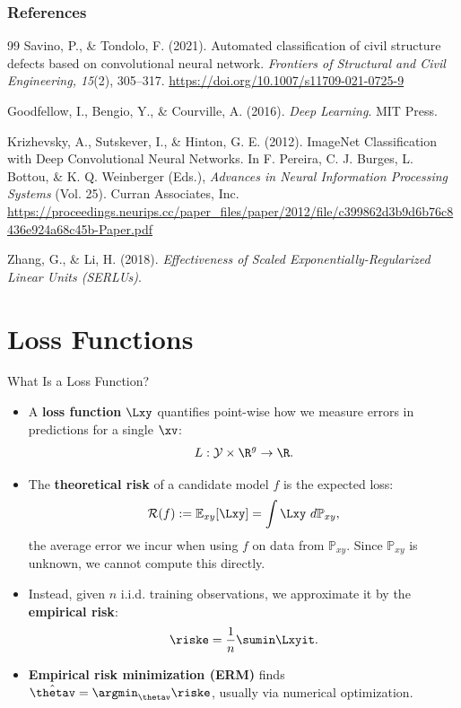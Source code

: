 \begin{vbframe}
\frametitle{References}
\footnotesize{
\begin{thebibliography}{99}
Savino, P., \& Tondolo, F. (2021). Automated classification of civil structure defects based on convolutional neural network. \textit{Frontiers of Structural and Civil Engineering, 15}(2), 305–317. \url{https://doi.org/10.1007/s11709-021-0725-9}


Goodfellow, I., Bengio, Y., \& Courville, A. (2016). \textit{Deep Learning}. MIT Press.

Krizhevsky, A., Sutskever, I., \& Hinton, G. E. (2012). ImageNet Classification with Deep Convolutional Neural Networks. In F. Pereira, C. J. Burges, L. Bottou, \& K. Q. Weinberger (Eds.), \textit{Advances in Neural Information Processing Systems} (Vol. 25). Curran Associates, Inc. \url{https://proceedings.neurips.cc/paper_files/paper/2012/file/c399862d3b9d6b76c8436e924a68c45b-Paper.pdf}

Zhang, G., \& Li, H. (2018). \textit{Effectiveness of Scaled Exponentially-Regularized Linear Units (SERLUs)}.

\end{thebibliography}
}
\end{vbframe}


\section{Loss Functions}

\begin{vbframe}{What Is a Loss Function?}
\begin{itemize}
\item A \textbf{loss function} $\Lxy$ quantifies point-wise how we measure
errors in predictions for a single $\xv$: $$L: \mathcal{Y} \times \R^g \to \R.$$
\item The \textbf{theoretical risk} of a candidate model $f$ is the expected
loss: $$\mathcal{R}(f) := \mathbb{E}_{xy}[\Lxy] = \int \Lxy ~ d\mathbb{P}_{xy},$$
the average error we incur when using $f$ on data from $\mathbb{P}_{xy}$. Since
$\mathbb{P}_{xy}$ is unknown, we cannot compute this directly.
\item Instead, given $n$ i.i.d. training observations, we approximate it by
the \textbf{empirical risk}: $$\riske = \frac{1}{n}\sumin \Lxyit.$$
\item \textbf{Empirical risk minimization (ERM)} finds $\hat{\thetav} =
\argmin_{\thetav} \riske$, usually via numerical optimization.
\end{itemize}
\end{vbframe}

